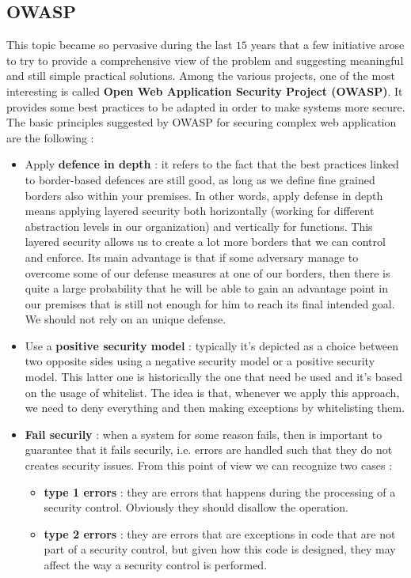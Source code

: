 \subsection{OWASP}
This topic became so pervasive during the last $15$ years that a few initiative arose to try to provide a comprehensive view of the problem and suggesting meaningful and still simple practical solutions. Among the various projects, one of the most interesting is called \textbf{Open Web Application Security Project (OWASP)}. It provides some best practices to be adapted in order to make systems more secure. The basic principles suggested by OWASP for securing complex web application are the following :
\begin{itemize}
\item Apply \textbf{defence in depth} : it refers to the fact that the best practices linked to border-based defences are still good, as long as we define fine grained borders also within your premises. In other words, apply defense in depth means applying layered security both horizontally (working for different abstraction levels in our organization) and vertically for functions. This layered security allows us to create a lot more borders that we can control and enforce. Its main advantage is that if some adversary manage to overcome some of our defense measures at one of our borders, then there is quite a large probability that he will be able to gain an advantage point in our premises that is still not enough for him to reach its final intended goal. We should not rely on an unique defense.
\item Use a \textbf{positive security model} : typically it's depicted as a choice between two opposite sides using a negative security model or a positive security model. This latter one is historically the one that need be used and it's based on the usage of whitelist. The idea is that, whenever we apply this approach, we need to deny everything and then making exceptions by whitelisting them.
\item \textbf{Fail securily} : when a system for some reason fails, then is important to guarantee that it fails securily, i.e. errors are handled such that they do not creates security issues. From this point of view we can recognize two cases :
\begin{itemize}
\item \textbf{type 1 errors} : they are errors that happens during the processing of a security control. Obviously they should disallow the operation.
\item \textbf{type 2 errors} : they are errors that are exceptions in code that are not part of a security control, but given how this code is designed, they may affect the way a security control is performed.

\end{itemize}
\end{itemize}
